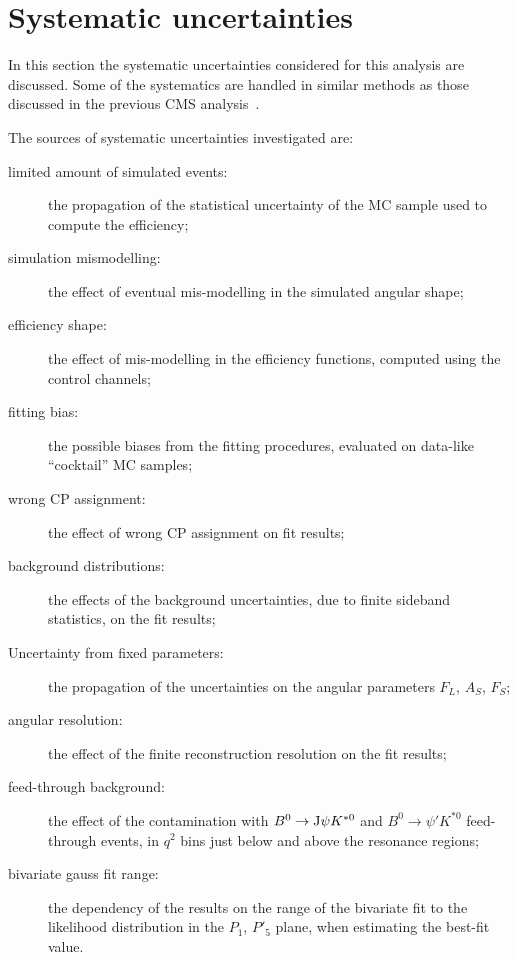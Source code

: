 \chapter{Systematic uncertainties}\label{sec:syst}

In this section the systematic uncertainties considered for this analysis are discussed.
Some of the systematics are handled in similar methods as those discussed in the previous CMS analysis~\cite{Khachatryan:2015isa,AN-14-129}.

The sources of systematic uncertainties investigated are:
\begin{description}
\item[limited amount of simulated events:] the propagation of the statistical uncertainty of the MC sample used to compute the efficiency;

\item[simulation mismodelling:] the effect of eventual mis-modelling in the simulated angular shape;

\item[efficiency shape:] the effect of mis-modelling in the efficiency functions, computed using the control channels;

\item[fitting bias:] the possible biases from the fitting procedures, evaluated on data-like ``cocktail'' MC samples;

\item[wrong CP assignment:] the effect of wrong CP assignment on fit results;

\item[background distributions:] the effects of the background \pdf uncertainties, due to finite sideband statistics, on the fit results;

\item[Uncertainty from fixed \pdf parameters:] the propagation of the uncertainties on the angular parameters $F_L$, $A_S$, $F_S$;

\item[angular resolution:] the effect of the finite reconstruction resolution on the fit results;
  
\item[feed-through background:] the effect of the contamination with $B^0 \to {\rm J}\psi K^{*0}$ and $B^0 \to \psi' K^{*0}$ feed-through events, in $q^2$ bins just below and above the resonance regions;

\item[bivariate gauss fit range:] the dependency of the results on the range of the bivariate fit to the likelihood distribution in the $P_1$, $P'_5$ plane, when estimating the best-fit value.

\end{description}

